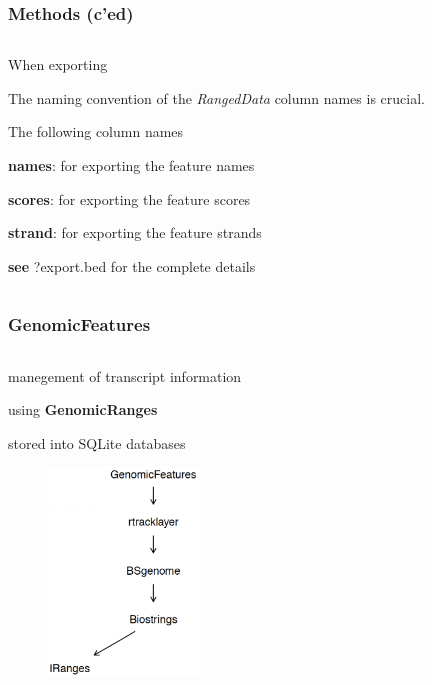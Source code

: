\documentclass{beamer}
\begin{document}
\begin{frame}
\frametitle{Methods (c'ed)}
\begin{column}{1\textwidth}
  \bit
      \item When exporting
        \bit
            \item The naming convention of the \emph{RangedData} column names is crucial.
            \item The following column names 
              \bit
                  \item \textbf{names}: for exporting the feature names
                  \item \textbf{scores}: for exporting the feature scores
                  \item \textbf{strand}: for exporting the feature strands
                  \item \textbf{see} ?export.bed for the complete  details
              \eit
        \eit
  \eit
  \end{column}
\end{frame}


\begin{frame}
\frametitle{GenomicFeatures}
\begin{column}{1\textwidth}
  \bit
      \item manegement of transcript information
        \bit
            \item using \textbf{GenomicRanges}
            \item stored into SQLite databases
        \eit
      \begin{figure}[ht]
      \centering
      \includegraphics[width=40mm]{diagramas/Seleccio_007.png}
      \end{figure}
  \eit
  \end{column}
\end{frame}
\end{document}
